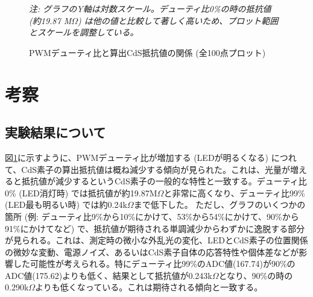 \documentclass[a4paper,11pt,dvipdfmx]{jsarticle}
\begin{document}
\begin{figure}[h!]
\caption{PWMデューティ比と算出CdS抵抗値の関係 (全100点プロット)}
\label{fig:cds_resistance_plot_full}
\textit{注: グラフのY軸は対数スケール。デューティ比0\%の時の抵抗値 (約19.87 M$\Omega$) は他の値と比較して著しく高いため、プロット範囲とスケールを調整している。}
\end{figure}

\section{考察}
\subsection{実験結果について}
図\ref{fig:cds_resistance_plot_full}に示すように、PWMデューティ比が増加する (LEDが明るくなる) につれて、CdS素子の算出抵抗値は概ね減少する傾向が見られた。これは、光量が増えると抵抗値が減少するというCdS素子の一般的な特性と一致する。デューティ比0\% (LED消灯時) では抵抗値が約19.87M$\Omega$と非常に高くなり、デューティ比99\% (LED最も明るい時) では約0.24k$\Omega$まで低下した。
ただし、グラフのいくつかの箇所 (例: デューティ比9\%から10\%にかけて、53\%から54\%にかけて、90\%から91\%にかけてなど) で、抵抗値が期待される単調減少からわずかに逸脱する部分が見られる。これは、測定時の微小な外乱光の変化、LEDとCdS素子の位置関係の微妙な変動、電源ノイズ、あるいはCdS素子自体の応答特性や個体差などが影響した可能性が考えられる。特にデューティ比99\%のADC値(167.74)が90\%のADC値(175.62)よりも低く、結果として抵抗値が0.243k$\Omega$となり、90\%の時の0.290k$\Omega$よりも低くなっている。これは期待される傾向と一致する。
\end{document}
